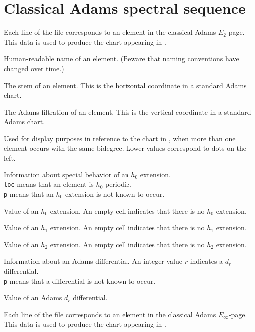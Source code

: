 \documentclass{amsart}
\begin{document}
\newpage

\section{Classical Adams spectral sequence}

Each line of the file corresponds to an element in the
classical Adams $E_2$-page.  This data is used to produce the
chart appearing in \cite{IWX19c}.

  Human-readable name of an element.
(Beware that naming conventions have changed over time.)

 The stem of an element.  This is the
horizontal coordinate in a standard Adams chart.

 The Adams filtration of 
an element.  This is the vertical coordinate in a standard 
Adams chart.

 Used for display purposes
in reference to the chart in \cite{IWX19c},
when more than one element occurs with the same bidegree.
Lower values correspond to dots on the left.

Information about special behavior of an $h_0$ extension. \\
\texttt{loc} means that an element is $h_0$-periodic. \\
\texttt{p} means that an $h_0$ extension is not known to occur.

 Value of an $h_0$ extension.  An empty cell indicates
that there is no $h_0$ extension.

Value of an $h_1$ extension.  An empty cell indicates
that there is no $h_1$ extension.

Value of an $h_2$ extension.  An empty cell indicates
that there is no $h_2$ extension.

Information about an Adams differential.
An integer value $r$ indicates a $d_r$ differential. \\
\texttt{p} means that a differential is not known to occur.

Value of an Adams $d_r$ differential.

\newpage

Each line of the file corresponds to an element in the
classical Adams $E_\infty$-page.  This data is used to produce the
chart appearing in \cite{IWX19c}.
\end{document}
